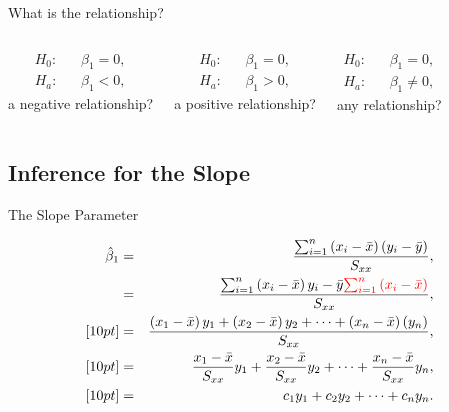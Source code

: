 \begin{frame}{What is the relationship?}


    \begin{columns}

      \begin{eqnarray*}
        H_0: & & \beta_1=0, \\
        H_a: & & \beta_1<0,
      \end{eqnarray*}
      a negative relationship?


      \begin{eqnarray*}
        H_0: & & \beta_1=0, \\
        H_a: & & \beta_1>0,
      \end{eqnarray*}
      a positive relationship?



      \begin{eqnarray*}
        H_0: & & \beta_1=0, \\
        H_a: & & \beta_1\neq 0,
      \end{eqnarray*}
      any relationship?

      
    \end{columns}

  
\end{frame}

\subsection{Inference for the Slope}

\begin{frame}{The Slope Parameter}

  \begin{eqnarray*}
    \hat{\beta}_1 & = & 
    \frac{\sum_{i=1}^n \left( x_i-\bar{x} \right) \left( y_i-\bar{y}\right)}{S_{xx}}, \\
    & = &  \frac{\sum_{i=1}^n \left( x_i - \bar{x} \right) y_i  - \bar{y} {\color{red}\sum_{i=1}^n \left( x_i-\bar{x} \right)}}{S_{xx}}, \\ [10pt]
      & =& \frac{\left( x_1 - \bar{x}\right) y_1  + \left( x_2 - \bar{x}\right) y_2 + \cdots + \left( x_n - \bar{x} \right)\left( y_n \right)}{S_{xx}}, \\ [10pt]
      & = & \frac{x_1- \bar{x}}{S_{xx}} y_1 + \frac{x_2- \bar{x}}{S_{xx}} y_2 + \cdots + \frac{x_n- \bar{x}}{S_{xx}} y_n, \\ [10pt]
      & = & c_1 y_1 + c_2 y_2 + \cdots + c_n y_n.
  \end{eqnarray*}
  
\end{frame}

